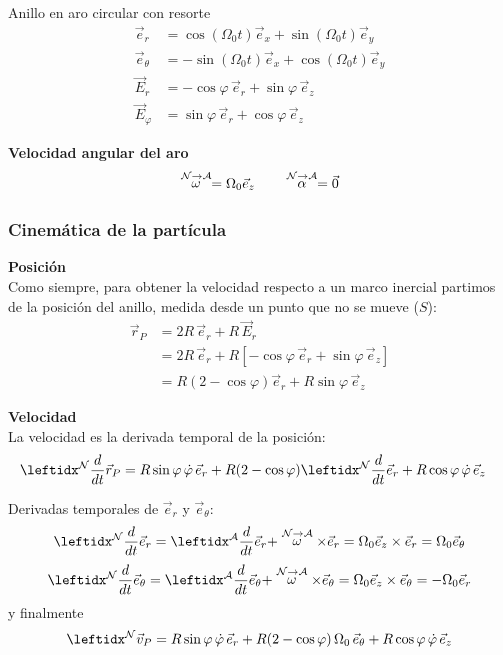 \begin{solucion}{Anillo en aro circular con resorte}
\begin{equation*}
\begin{split}
    \vec{e}_r&=\cos(\Omega_0 t)\vec{e}_x+\sin(\Omega_0 t)\vec{e}_y\\
    \vec{e}_\theta&=-\sin(\Omega_0 t)\vec{e}_x+\cos(\Omega_0 t)\vec{e}_y\\
    \vec{E}_r&=-\cos\varphi\,\vec{e}_r+\sin\varphi\,\vec{e}_z\\
    \vec{E}_\varphi&=\sin\varphi\,\vec{e}_r+\cos\varphi\,\vec{e}_z
\end{split}
\end{equation*}

\textbf{Velocidad angular del aro}\\
$$\stackrel{\mathcal{N} \to \mathcal{A}}{\omega}=\Omega_0\vec{e}_z\qquad\stackrel{\mathcal{N} \to \mathcal{A}}{\alpha}=\vec{0}$$

\subsubsection*{Cinemática de la partícula}
\textbf{Posición}\\
Como siempre, para obtener la velocidad respecto a un marco inercial partimos de la posición del anillo, medida desde un punto que no se mueve ($S$):
\begin{align*}
    \vec{r}_P &= 2R\,\vec{e}_r + R\,\vec{E}_r \\
              &= 2R\,\vec{e}_r + R\left[ -\cos\varphi\,\vec{e}_r + \sin\varphi\,\vec{e}_z \right] \\
              &= R\left(2 - \cos\varphi\right)\vec{e}_r + R\sin\varphi\,\vec{e}_z
\end{align*}

\textbf{Velocidad}\\
La velocidad es la derivada temporal de la posición:
\begin{align*}
\der{\vec{r}_P}{N}{} &= R \sin\varphi\,\dot{\varphi}\,\vec{e}_r + R(2 - \cos\varphi)\der{\vec{e}_r}{N}{} + R \cos\varphi\,\dot{\varphi}\,\vec{e}_z
\end{align*}


Derivadas temporales de $\vec{e}_r$ y $\vec{e}_\theta$:
$$\transport{\vec{e}_r}{N}{A}=\Omega_0\vec{e}_z\times\vec{e}_r=\Omega_0\vec{e}_\theta$$
$$\transport{\vec{e}_\theta}{N}{A}=\Omega_0\vec{e}_z\times\vec{e}_\theta=-\Omega_0\vec{e}_r$$
y finalmente
$$\marc{\vec{v}_P}{N}= R \sin\varphi\,\dot{\varphi}\,\vec{e}_r + R(2 - \cos\varphi)\,\Omega_0\,\vec{e}_\theta + R \cos\varphi\,\dot{\varphi}\,\vec{e}_z$$


\end{solucion}
